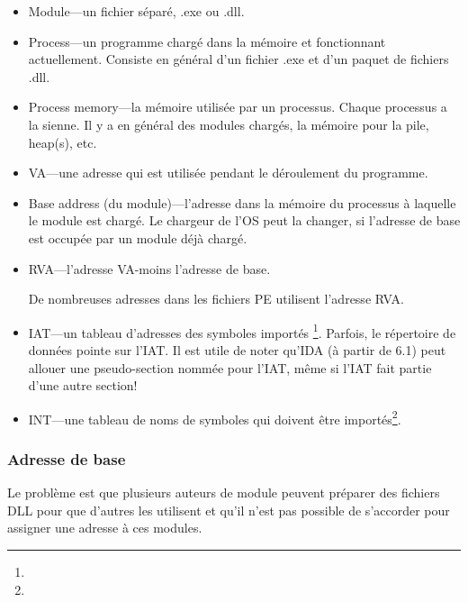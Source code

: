 \begin{itemize}
\item Module---un fichier séparé, .exe ou .dll.

\item Process---un programme chargé dans la mémoire et fonctionnant actuellement.
Consiste en général d'un fichier .exe et d'un paquet de fichiers .dll.

\item Process memory---la mémoire utilisée par un processus. Chaque processus a la
sienne. Il y a en général des modules chargés, la mémoire pour la pile, \gls{heap}(s),
etc.

\item \ac{VA}---une adresse qui est utilisée pendant le déroulement du programme.

\item Base address (du module)---l'adresse dans la mémoire du processus à laquelle
le module est chargé. Le chargeur de l'\ac{OS} peut la changer, si l'adresse de base
est occupée par un module déjà chargé.

\item \ac{RVA}---l'adresse \ac{VA}-moins l'adresse de base.

De nombreuses adresses dans les fichiers PE utilisent l'adresse \ac{RVA}.


\item \ac{IAT}---un tableau d'adresses des symboles importés \footnote{\PietrekPE}. 
Parfois, le répertoire de données  pointe sur l'\ac{IAT}.
\label{IDA_idata}
Il est utile de noter qu'\ac{IDA} (à partir de 6.1) peut allouer une pseudo-section
nommée  pour l'\ac{IAT}, même si l'\ac{IAT} fait partie d'une autre section!

\item \ac{INT}---une tableau de noms de symboles qui doivent être importés\footnote{\PietrekPE}.
\end{itemize}

\subsubsection{Adresse de base}

Le problème est que plusieurs auteurs de module peuvent préparer des fichiers DLL
pour que d'autres les utilisent et qu'il n'est pas possible de s'accorder pour assigner
une adresse à ces modules.


